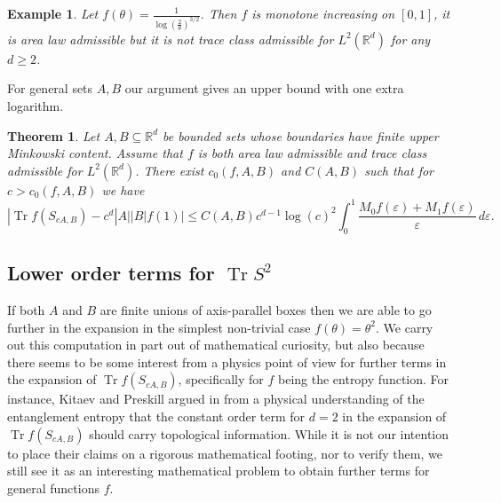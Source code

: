 \documentclass[12pt]{amsart}
\numberwithin{equation}{section}
\newcommand{\R}{\mathbb{R}}
\newcommand{\eps}{\varepsilon}
\newtheorem{theorem}[Thm]{Theorem}
\newtheorem{example}{Example}
\begin{document}
\begin{example}
Let $f(\theta) = \frac{1}{\log(\frac{2}{\theta})^{3/2}}$. Then $f$ is monotone increasing on $[0, 1]$, it is area law admissible but it is not trace class admissible for $L^2(\R^d)$ for any $d\ge 2$.
\end{example}
For general sets $A, B$ our argument gives an upper bound with one extra logarithm.
\begin{theorem}\label{bad area law}
Let $A, B\subseteq \R^d$ be bounded sets whose boundaries have finite upper Minkowski content. Assume that $f$ is both  area law admissible and trace class admissible for $L^2(\R^d)$. There exist $c_0(f, A, B)$ and $C(A, B)$ such that for $c > c_0(f, A, B)$ we have
\begin{equation*}
|\operatorname{Tr} f(S_{cA,B})- c^d |A||B| f(1)|\leq C(A,B) c^{d-1}\log(c)^2 \int_0^1 \frac{M_0 f(\eps) + M_1 f(\eps)}{\eps} \, d\eps.
\end{equation*}
\end{theorem}




\subsection{Lower order terms for $\operatorname{Tr} S^2$}
If both $A$ and $B$ are finite unions of axis-parallel boxes then we are able to go further in the expansion in the simplest non-trivial case $f(\theta) = \theta^2$. We carry out this computation in part out of mathematical curiosity, %
but also because there seems to be some interest from a physics point of view for further terms in the expansion of $\operatorname{Tr}f(S_{cA,B})$, specifically for $f$ being the entropy function. For instance, Kitaev and Preskill argued in \cite{Kitaev_preskill} from a physical understanding of the entanglement entropy that the constant order term for $d=2$ in the expansion of $\operatorname{Tr} f(S_{cA,B})$ should carry topological information. While it is not our intention to place their claims on a rigorous mathematical footing, nor to verify them, we still see it as an interesting mathematical problem to obtain further terms for general functions $f$.
\end{document}
